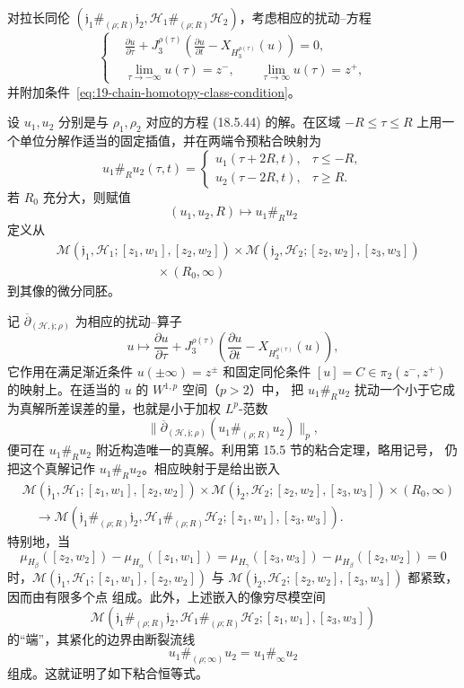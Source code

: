 对拉长同伦
$(\mathfrak j_1\#_{(\rho;R)}\mathfrak j_2,
\mathcal H_1\#_{(\rho;R)}\mathcal H_2)$，考虑相应的扰动\personCauchy{}--\personRiemann{}方程
\[
 \left\{
 \begin{aligned}
 &\frac{\partial u}{\partial\tau}
 +J_3^{\rho(\tau)}
 \left(\frac{\partial u}{\partial t}-X_{H_3^{\rho(\tau)}}(u)\right)=0,\\
 &\lim_{\tau\to-\infty}u(\tau)=z^-,\qquad
 \lim_{\tau\to\infty}u(\tau)=z^+,
 \end{aligned}
 \right.
\]
并附加条件~\eqref{eq:19-chain-homotopy-class-condition}。

设 $u_1,u_2$ 分别是与 $\rho_1,\rho_2$ 对应的方程 (18.5.44) 的解。在区域
$-R\leq\tau\leq R$ 上用一个单位分解作适当的固定插值，并在两端令预粘合映射为
\[
 u_1\#_Ru_2(\tau,t)=
 \begin{cases}
 u_1(\tau+2R,t),&\tau\leq-R,\\
 u_2(\tau-2R,t),&\tau\geq R.
 \end{cases}
\]
若 $R_0$ 充分大，则赋值
\[
 (u_1,u_2,R)\longmapsto u_1\#_Ru_2
\]
定义从
\[
\begin{aligned}
 &\mathcal M(\mathfrak j_1,\mathcal H_1;[z_1,w_1],[z_2,w_2])
 \times\mathcal M(\mathfrak j_2,\mathcal H_2;[z_2,w_2],[z_3,w_3])\\
 &\hspace{8em}\times(R_0,\infty)
\end{aligned}
\]
到其像的微分同胚。

记 $\overline\partial_{(\mathcal H,\mathfrak j;\rho)}$ 为相应的扰动\personCauchy{}--\personRiemann{}算子
\[
 u\longmapsto\frac{\partial u}{\partial\tau}
 +J_3^{\rho(\tau)}
 \left(\frac{\partial u}{\partial t}-X_{H_3^{\rho(\tau)}}(u)\right),
\]
它作用在满足渐近条件 $u(\pm\infty)=z^\pm$ 和固定同伦条件
$[u]=C\in\pi_2(z^-,z^+)$ 的映射上。在适当的 $u$ 的 $W^{1,p}$ 空间（$p>2$）中，
把 $u_1\#_Ru_2$ 扰动一个小于它成为真解所差误差的量，也就是小于加权 $L^p$-范数
\[
 \bigl\|\overline\partial_{(\mathcal H,\mathfrak j;\rho)}
 (u_1\#_{(\rho;R)}u_2)\bigr\|_p,
\]
便可在 $u_1\#_Ru_2$ 附近构造唯一的真解。利用第 15.5 节的粘合定理，略用记号，
仍把这个真解记作 $u_1\#_Ru_2$。相应映射于是给出嵌入
\[
\begin{aligned}
 &\mathcal M(\mathfrak j_1,\mathcal H_1;[z_1,w_1],[z_2,w_2])
 \times\mathcal M(\mathfrak j_2,\mathcal H_2;[z_2,w_2],[z_3,w_3])
 \times(R_0,\infty)\\
 &\quad\longrightarrow
 \mathcal M(\mathfrak j_1\#_{(\rho;R)}\mathfrak j_2,
 \mathcal H_1\#_{(\rho;R)}\mathcal H_2;[z_1,w_1],[z_3,w_3]).
\end{aligned}
\]
特别地，当
\[
 \mu_{H_\beta}([z_2,w_2])-\mu_{H_\alpha}([z_1,w_1])
 =\mu_{H_\gamma}([z_3,w_3])-\mu_{H_\beta}([z_2,w_2])=0
\]
时，$\mathcal M(\mathfrak j_1,\mathcal H_1;[z_1,w_1],[z_2,w_2])$ 与
$\mathcal M(\mathfrak j_2,\mathcal H_2;[z_2,w_2],[z_3,w_3])$ 都紧致，因而由有限多个点
组成。此外，上述嵌入的像穷尽模空间
\[
 \mathcal M(\mathfrak j_1\#_{(\rho;R)}\mathfrak j_2,
 \mathcal H_1\#_{(\rho;R)}\mathcal H_2;[z_1,w_1],[z_3,w_3])
\]
的“端”，其紧化的边界由断裂流线
\[
 u_1\#_{(\rho;\infty)}u_2=u_1\#_\infty u_2
\]
组成。这就证明了如下粘合恒等式。

